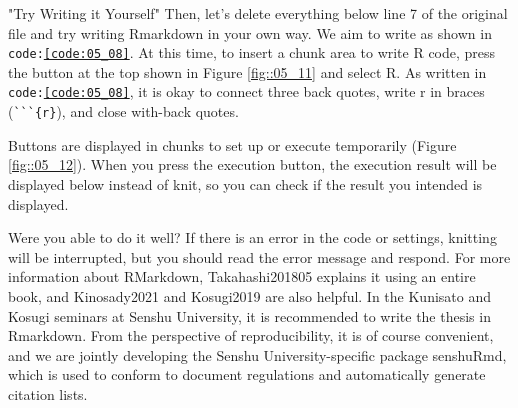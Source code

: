 \documentclass{ltjsbook}
\begin{document}
"Try Writing it Yourself"
Then, let's delete everything below line 7 of the original file and try writing Rmarkdown in your own way.
We aim to write as shown in \texttt{code:\ref{code:05_08}}.
At this time, to insert a chunk area to write R code, press the button at the top shown in Figure \ref{fig::05_11} and select R. As written in \texttt{code:\ref{code:05_08}}, it is okay to connect three back quotes, write r in braces (\verb|```{r}|), and close with-back quotes.

Buttons are displayed in chunks to set up or execute temporarily (Figure \ref{fig::05_12}). When you press the execution button, the execution result will be displayed below instead of knit, so you can check if the result you intended is displayed.







Were you able to do it well? If there is an error in the code or settings, knitting will be interrupted, but you should read the error message and respond. For more information about RMarkdown, Takahashi201805 explains it using an entire book, and Kinosady2021 and Kosugi2019 are also helpful. In the Kunisato and Kosugi seminars at Senshu University, it is recommended to write the thesis in Rmarkdown. From the perspective of reproducibility, it is of course convenient, and we are jointly developing the Senshu University-specific package senshuRmd, which is used to conform to document regulations and automatically generate citation lists.
\end{document}

